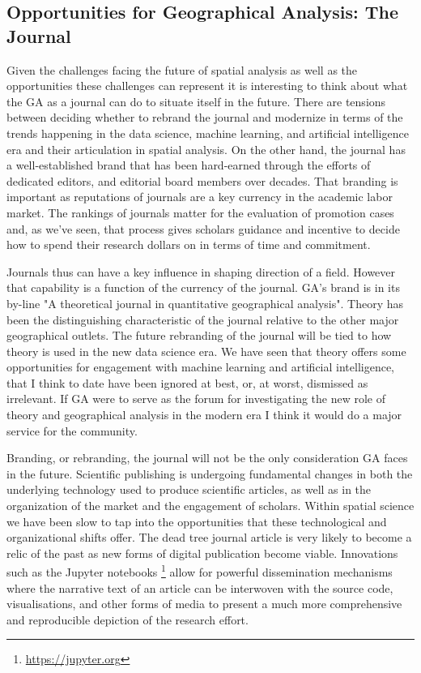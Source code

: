 \documentclass[11pt]{article}
\begin{document}
\subsection{Opportunities for Geographical Analysis: The Journal}
\label{sec:org01c95fd}


Given the challenges facing the future of spatial analysis as well as the
opportunities these challenges can represent it is interesting to think about
what the GA as a journal can do to situate itself in the future. There are
tensions between deciding whether to rebrand the journal and modernize in terms
of the trends happening in the data science, machine learning, and artificial
intelligence era and their articulation in spatial analysis. On the other hand,
the journal has a well-established brand that has been hard-earned through the
efforts of dedicated editors, and editorial board members over decades. That
branding is important as reputations of journals are a key currency in the
academic labor market. The rankings of journals matter for the evaluation of
promotion cases and, as we've seen, that process gives scholars guidance and
incentive to decide how to spend their research dollars on in terms of time and
commitment.

Journals thus can have a key influence in shaping direction of a field. However
that capability is a function of the currency of the journal. GA's brand is in
its by-line "A theoretical journal in quantitative geographical analysis".
Theory has been the distinguishing characteristic of the journal relative to
the other major geographical outlets. The future rebranding of the journal
will be tied to how theory is used in the new data science era. We have seen
that theory offers some opportunities for engagement with machine
learning and artificial intelligence, that I think to date have been ignored at
best, or, at worst, dismissed as irrelevant. If GA were to serve as the forum for
investigating the new role of theory and geographical analysis in the modern
era I think it would do a major service for the community.

Branding, or rebranding, the journal will not be the only consideration GA faces
in the future. Scientific publishing is undergoing fundamental changes in both
the underlying technology used to produce scientific articles, as well as in the
organization of the market and the engagement of scholars. Within spatial
science we have been slow to tap into the opportunities that these technological
and organizational shifts offer. The dead tree journal article is very likely to
become a relic of the past as new forms of digital publication become viable.
Innovations such as the Jupyter notebooks \footnote{\url{https://jupyter.org}}
allow for powerful dissemination mechanisms where the narrative text of an
article can be interwoven with the source code, visualisations, and other forms
of media to present a much more comprehensive and reproducible depiction of the
research effort.
\end{document}
